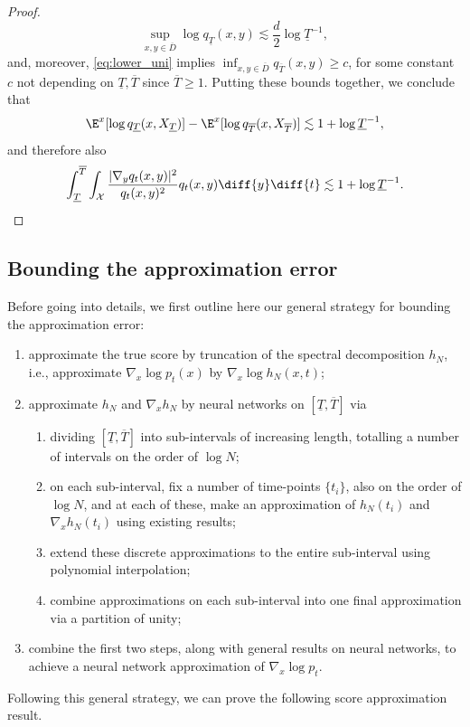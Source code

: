 \documentclass[a4paper, 11pt, headings = small, abstract]{scrartcl}
\begin{document}
\begin{proof}
\[\sup_{x,y \in \overline{D}} \log q_{\underline{T}}(x,y) \lesssim \frac{d}{2} \log \underline{T}^{-1},\]
and, moreover, \eqref{eq:lower_uni} implies $\inf_{x,y \in \overline{D}} q_{\overline{T}}(x,y) \geq c$, for some constant $c$ not depending on $\underline{T},\overline{T}$ since $\overline{T} \geq 1$.
Putting these bounds together, we conclude that 
\[\E^x[\log q_{\underline{T}}(x,X_{\underline{T}})] - \E^x[\log q_{\overline{T}}(x,X_{\overline{T}})] \lesssim 1 + \log \underline{T}^{-1},\]
and therefore also 
\[\int_{\underline{T}}^{\overline{T}} \int_{\mathcal{X}} \frac{\lvert \nabla_y q_t(x,y) \rvert^2}{q_t(x,y)^2} q_t(x,y) \diff{y} \diff{t} \lesssim 1 + \log \underline{T}^{-1}.\]
\end{proof}



\subsection{Bounding the approximation error}\label{subsec:approx}
Before going into details, we first outline here our general strategy for bounding the approximation error:
\begin{enumerate}
    \item approximate the true score by truncation of the spectral decomposition $h_N$, i.e., approximate $\nabla_x\log p_t(x)$ by $\nabla_x\log h_N(x, t)$;
    \item approximate $h_N$ and $\nabla_xh_N$ by neural networks on $[\underline{T}, \overline{T}]$ via
    \begin{enumerate}[label=(\alph*)]
        \item dividing $[\underline{T},\overline{T}]$ into sub-intervals of increasing length, totalling a number of intervals on the order of $\log N$;
        \item on each sub-interval, fix a number of time-points $\{t_i\}$, also on the order of $\log N$, and at each of these, make an approximation of $h_N(t_i)$ and $\nabla_xh_N(t_i)$ using existing results;
        \item extend these discrete approximations to the entire sub-interval using polynomial interpolation;
        \item combine approximations on each sub-interval into one final approximation via a partition of unity;
    \end{enumerate}
    \item combine the first two steps, along with general results on neural networks, to achieve a neural network approximation of $\nabla_x\log p_t$.
\end{enumerate}
Following this general strategy, we can prove the following score approximation result. %
\end{document}

